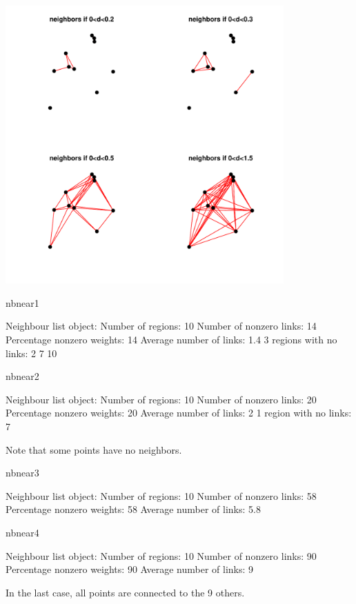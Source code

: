 \documentclass[a4paper]{article}
\begin{document}
\begin{center}
\includegraphics[width=0.8\textwidth,keepaspectratio]{figs/tutorial-ni7}
\end{center}
\begin{Schunk}
\begin{Sinput}
 nbnear1
\end{Sinput}
\begin{Soutput}
Neighbour list object:
Number of regions: 10 
Number of nonzero links: 14 
Percentage nonzero weights: 14 
Average number of links: 1.4 
3 regions with no links:
2 7 10
\end{Soutput}
\begin{Sinput}
 nbnear2
\end{Sinput}
\begin{Soutput}
Neighbour list object:
Number of regions: 10 
Number of nonzero links: 20 
Percentage nonzero weights: 20 
Average number of links: 2 
1 region with no links:
7
\end{Soutput}
\end{Schunk}
Note that some points have no neighbors.
\begin{Schunk}
\begin{Sinput}
 nbnear3
\end{Sinput}
\begin{Soutput}
Neighbour list object:
Number of regions: 10 
Number of nonzero links: 58 
Percentage nonzero weights: 58 
Average number of links: 5.8 
\end{Soutput}
\begin{Sinput}
 nbnear4
\end{Sinput}
\begin{Soutput}
Neighbour list object:
Number of regions: 10 
Number of nonzero links: 90 
Percentage nonzero weights: 90 
Average number of links: 9 
\end{Soutput}
\end{Schunk}
In the last case, all points are connected to the 9 others.
\end{document}
